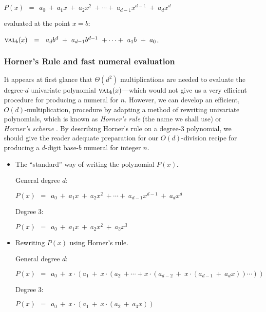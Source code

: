 $P(x) \ \ = \ \ a_0 \ + \ a_1 x \ + \ a_2 x^2 \ + \cdots + \ a_{d-1}
x^{d-1} \ + \ a_d x^d$

\noindent
evaluated at the point $x=b$:

$\mbox{\sc val}_{b}(x) \ \ = \ \ a_d b^d \ + \ a_{d-1} b^{d-1} \ +
\cdots + \ a_1 b \ + \ a_0$.

\subsubsection{Horner's Rule and fast numeral evaluation}

It appears at first glance that $\Theta(d^2)$ multiplications are
needed to evaluate the degree-$d$ univariate polynomial $\mbox{\sc
  val}_{b}(x)$---which would not give us a very efficient procedure
for producing a numeral for $n$.  However, we can develop an
efficient, $O(d)$-multiplication, procedure by adapting a method of
rewriting univariate polynomials, which is known as {\it Horner's
  rule} (the name we shall use) or {\it Horner's scheme}
\cite{Horner}.  
  By
describing Horner's rule on a degree-$3$ polynomial, we should give
the reader adequate preparation for our $O(d)$-division recipe for
producing a $d$-digit base-$b$ numeral for integer $n$.

\medskip

\begin{itemize}
\item {\small\sf The ``standard'' way of writing the polynomial $P(x)$.}

\noindent General degree $d$:

$P(x) \ \ = \ \ a_0 \ + \ a_1 x \ + \ a_2 x^2 \ + \cdots + \ a_{d-1}
x^{d-1} \ + \ a_d x^d$

\noindent Degree $3$:

$P(x) \ \ = \ \ a_0 \ + \ a_1 x \ + \ a_2 x^2 \ + \ a_3 x^3$

\item {\small\sf Rewriting $P(x)$ using Horner's rule.}

\noindent General degree $d$:

$P(x) \ \ = \ \ a_0 \ + \ x \cdot (a_1 \ + \ x \cdot (a_2  \ +  \cdots
+ x \cdot (a_{d-2} \ + \ x \cdot (a_{d-1} \ + \ a_d x)) \cdots ))$  

\noindent Degree $3$:

$P(x) \ \ = \ \ a_0 \ + \ x \cdot (a_1 \ + \ x \cdot (a_2  \ + \ a_3 x))$ 
\end{itemize}

